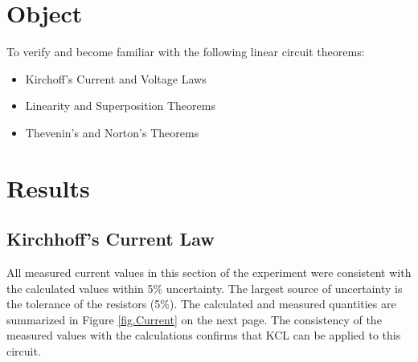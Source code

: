 \documentclass[12pt]{article}
\begin{document}
\section{Object}
To verify and become familiar with the following linear circuit theorems:
\begin{itemize}
	\item Kirchoff's Current and Voltage Laws
	\item Linearity and Superposition Theorems
	\item Thevenin's and Norton's Theorems
\end{itemize}


\section{Results}
\subsection{Kirchhoff's Current Law}
All measured current values in this section of the experiment were consistent with the calculated 
values within 5\% uncertainty. The largest source of uncertainty is the tolerance of the resistors 
(5\%). The calculated and measured quantities are summarized in Figure \ref{fig.Current} on the next page.
The consistency of the measured values with the calculations confirms that KCL can be applied 
to this circuit.
\end{document}
